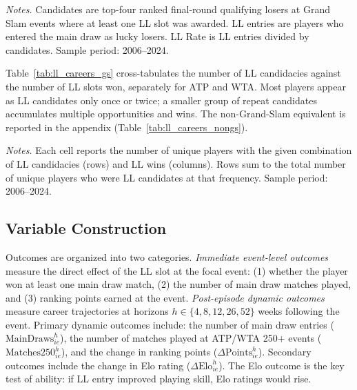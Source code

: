 \begin{table}[htbp]
\centering
\caption{Lucky Loser Distribution by Grand Slam and Tour}
\label{tab:ll_dist_gs}
\begin{threeparttable}

\begin{tablenotes}
\footnotesize
\item \textit{Notes.} Candidates are top-four ranked final-round qualifying losers at Grand Slam events where at least one LL slot was awarded. LL entries are players who entered the main draw as lucky losers. LL Rate is LL entries divided by candidates. Sample period: 2006--2024.
\end{tablenotes}
\end{threeparttable}
\end{table}

Table~\ref{tab:ll_careers_gs} cross-tabulates the number of LL candidacies against the number of LL slots won, separately for ATP and WTA. Most players appear as LL candidates only once or twice; a smaller group of repeat candidates accumulates multiple opportunities and wins. The non-Grand-Slam equivalent is reported in the appendix (Table~\ref{tab:ll_careers_nongs}).

\begin{table}[htbp]
\centering
\caption{Player LL Candidacies and Wins: Grand Slam}
\label{tab:ll_careers_gs}
\begin{threeparttable}
\small

\begin{tablenotes}
\footnotesize
\item \textit{Notes.} Each cell reports the number of unique players with the given combination of LL candidacies (rows) and LL wins (columns). Rows sum to the total number of unique players who were LL candidates at that frequency. Sample period: 2006--2024.
\end{tablenotes}
\end{threeparttable}
\end{table}

\subsection{Variable Construction}
\label{sec:data_variables}

Outcomes are organized into two categories. \textit{Immediate event-level outcomes} measure the direct effect of the LL slot at the focal event: (1) whether the player won at least one main draw match, (2) the number of main draw matches played, and (3) ranking points earned at the event. \textit{Post-episode dynamic outcomes} measure career trajectories at horizons $h \in \{4, 8, 12, 26, 52\}$ weeks following the event. Primary dynamic outcomes include: the number of main draw entries ($\text{MainDraws}_{ie}^{h}$), the number of matches played at ATP/WTA 250+ events ($\text{Matches250}_{ie}^{h}$), and the change in ranking points ($\Delta \text{Points}_{ie}^{h}$). Secondary outcomes include the change in Elo rating ($\Delta \text{Elo}_{ie}^{h}$). The Elo outcome is the key test of ability: if LL entry improved playing skill, Elo ratings would rise.

